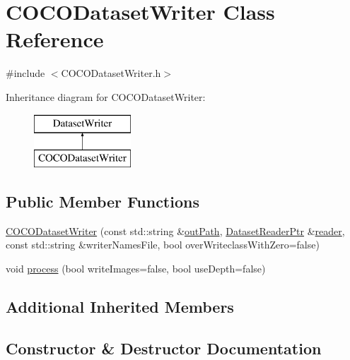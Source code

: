 \hypertarget{class_c_o_c_o_dataset_writer}{}\section{C\+O\+C\+O\+Dataset\+Writer Class Reference}
\label{class_c_o_c_o_dataset_writer}


{\ttfamily \#include $<$C\+O\+C\+O\+Dataset\+Writer.\+h$>$}

Inheritance diagram for C\+O\+C\+O\+Dataset\+Writer\+:\begin{figure}[H]
\begin{center}
\leavevmode
\includegraphics[height=2.000000cm]{class_c_o_c_o_dataset_writer}
\end{center}
\end{figure}
\subsection*{Public Member Functions}
\begin{DoxyCompactItemize}
\item 
\hyperlink{class_c_o_c_o_dataset_writer_adec3d112a29a894f380b0e72ffde9f93}{C\+O\+C\+O\+Dataset\+Writer} (const std\+::string \&\hyperlink{class_dataset_writer_ac19eabc3e69f6e9bc4c5185803eed626}{out\+Path}, \hyperlink{_dataset_reader_8h_a30d89cba514a220d64d04535c0465f1c}{Dataset\+Reader\+Ptr} \&\hyperlink{class_dataset_writer_a2edef70c0de507a2e056eb3984705811}{reader}, const std\+::string \&writer\+Names\+File, bool over\+Writeclass\+With\+Zero=false)
\item 
void \hyperlink{class_c_o_c_o_dataset_writer_a82b054ee143507382ae3f87b46c246d6}{process} (bool write\+Images=false, bool use\+Depth=false)
\end{DoxyCompactItemize}
\subsection*{Additional Inherited Members}


\subsection{Constructor \& Destructor Documentation}
\mbox{\label{class_c_o_c_o_dataset_writer_adec3d112a29a894f380b0e72ffde9f93}} 
